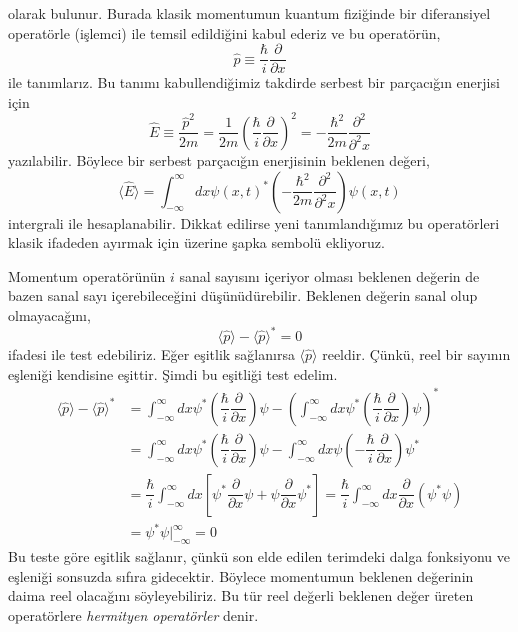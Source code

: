 \documentclass[a4paper,12pt, twoside]{article}
\begin{document}
olarak bulunur. Burada klasik momentumun kuantum fiziğinde bir diferansiyel operatörle (işlemci) ile temsil edildiğini kabul ederiz ve bu operatörün,
\begin{equation}
\hat p \equiv \dfrac {\hbar }{i}\dfrac {\partial}{\partial x}
\end{equation}
ile tanımlarız. Bu tanımı kabullendiğimiz takdirde serbest bir parçacığın enerjisi için
\begin{equation}
\hat E \equiv \dfrac{\hat p^2}{2 m} = \dfrac {1 }{2 m}\left(\dfrac {\hbar }{i}\dfrac {\partial}{\partial x}\right)^2 = -\dfrac {\hbar^2 }{2 m}\dfrac {\partial^2}{\partial^2 x}
\end{equation}
yazılabilir. Böylece bir serbest parçacığın enerjisinin beklenen değeri,
\begin{equation}
\langle \hat E\rangle =  \int ^{\infty }_{-\infty }dx \psi(x,t) ^{\ast }\left(-\dfrac {\hbar^2 }{2 m}\dfrac {\partial^2}{\partial^2 x}\right) \psi(x,t)
\label{eq:expactation_value_and_op_energy}
\end{equation}
intergrali ile hesaplanabilir. Dikkat edilirse yeni tanımlandığımız bu operatörleri klasik ifadeden ayırmak için üzerine şapka sembolü ekliyoruz.

Momentum operatörünün $i$ sanal sayısını içeriyor olması beklenen değerin de bazen sanal sayı içerebileceğini düşünüdürebilir. Beklenen değerin sanal olup olmayacağını,
\begin{equation}
\langle \hat p \rangle - \langle \hat p \rangle^\ast = 0
\end{equation}
ifadesi ile test edebiliriz. Eğer eşitlik sağlanırsa $\langle \hat p \rangle$ reeldir. Çünkü, reel bir sayının eşleniği kendisine eşittir. Şimdi bu eşitliği test edelim.
\begin{align*}
\langle \hat p \rangle - \langle \hat p \rangle^\ast &= \int ^{\infty }_{-\infty }dx \psi ^{\ast }\left(\dfrac {\hbar }{i}\dfrac {\partial}{\partial x}\right) \psi - \left(  \int ^{\infty }_{-\infty }dx \psi ^{\ast }\left(\dfrac {\hbar }{i}\dfrac {\partial}{\partial x}\right) \psi  \right)^\ast \\
&= \int ^{\infty }_{-\infty }dx \psi ^{\ast }\left(\dfrac {\hbar }{i}\dfrac {\partial}{\partial x}\right) \psi -   \int ^{\infty }_{-\infty }dx \psi \left(-\dfrac {\hbar }{i}\dfrac {\partial}{\partial x}\right) \psi^\ast \\
&= \dfrac {\hbar }{i} \int ^{\infty }_{-\infty }dx \left[\psi ^{\ast } \dfrac {\partial}{\partial x} \psi +  \psi \dfrac {\partial}{\partial x}\psi^\ast\right] = \dfrac {\hbar }{i} \int ^{\infty }_{-\infty }dx \dfrac {\partial}{\partial x}\left( \psi ^{\ast } \psi\right)\\
&=\psi^\ast \psi {\bigg |}^{\infty}_{-\infty} = 0
\end{align*}
Bu teste göre eşitlik sağlanır, çünkü son elde edilen terimdeki dalga fonksiyonu ve eşleniği sonsuzda sıfıra gidecektir. Böylece momentumun beklenen değerinin daima reel olacağını söyleyebiliriz. Bu tür reel değerli beklenen değer üreten operatörlere \emph{hermityen operatörler} denir.
\end{document}
